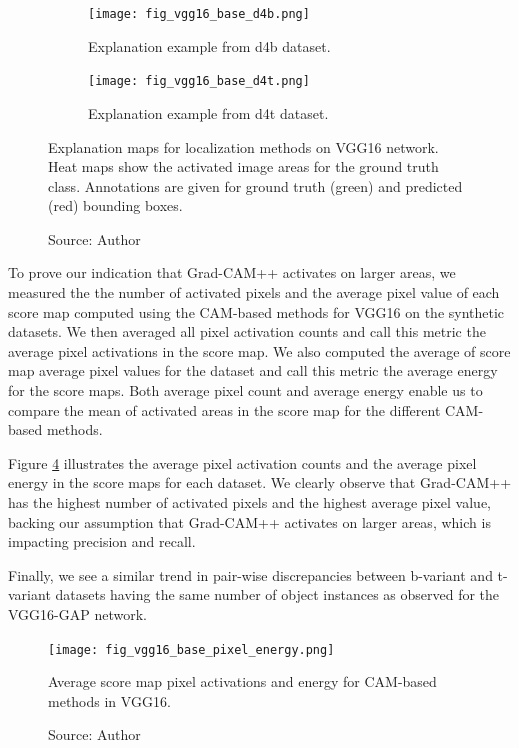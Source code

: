 \begin{figure}[h]
    \begin{center}
    \begin{subfigure}[b]{\textwidth}
         \centering
         \texttt{[image: fig\_vgg16\_base\_d4b.png]}
         \caption{Explanation example from d4b dataset.}
         \label{fig:vgg16_base_explanation_d4b}
    \end{subfigure}
    \begin{subfigure}[b]{\textwidth}
         \centering
         \texttt{[image: fig\_vgg16\_base\_d4t.png]}
         \caption{Explanation example from d4t dataset.}
         \label{fig:vgg16_base_explanation_d4t}
    \end{subfigure}
    \caption[Explanation maps for localization methods on VGG16 network]{Explanation maps for localization methods on VGG16 network. Heat maps show the activated image areas for the ground truth class. Annotations are given for ground truth (green) and predicted (red) bounding boxes.}
    \caption*{Source: Author}
    \label{fig:vgg16_base_explanation}
    \end{center}
\end{figure}

To prove our indication that Grad-CAM++ activates on larger areas, we measured the the number of activated pixels and the average pixel value of each score map computed using the CAM-based methods for VGG16 on the synthetic datasets. We then averaged all pixel activation counts and call this metric the average pixel activations in the score map. We also computed the average of score map average pixel values for the dataset and call this metric the average energy for the score maps. Both average pixel count and average energy enable us to compare the mean of  activated areas in the score map for the different CAM-based methods.

Figure \ref{fig:vgg16_base_pixel_energy} illustrates the average pixel activation counts and the average pixel energy in the score maps for each dataset. We clearly observe that Grad-CAM++ has the highest number of activated pixels and the highest average pixel value, backing our assumption that Grad-CAM++ activates on larger areas, which is impacting precision and recall.

Finally, we see a similar trend in pair-wise discrepancies between b-variant and t-variant datasets having the same number of object instances as observed for the VGG16-GAP network.  

\begin{figure}[h]
    \begin{center}       
    \texttt{[image: fig\_vgg16\_base\_pixel\_energy.png]}
    \caption[Average score map pixel activations and energy for CAM-based methods in VGG16]{Average score map pixel activations and energy for CAM-based methods in VGG16.}
    \caption*{Source: Author}
    \label{fig:vgg16_base_pixel_energy}
    \end{center}
\end{figure}

